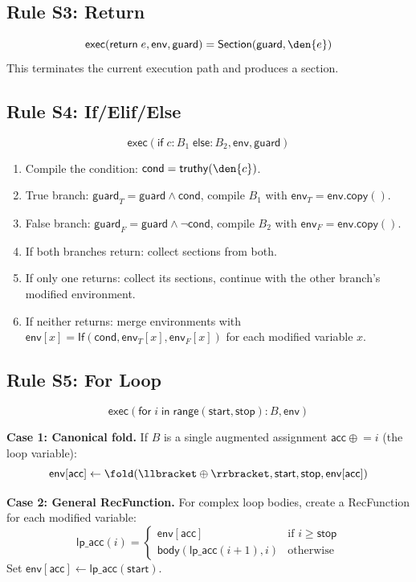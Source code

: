 \subsection{Rule S3: Return}
\[
  \mathsf{exec}(\mathsf{return}\; e, \mathsf{env}, \mathsf{guard}) =
    \mathsf{Section}(\mathsf{guard}, \den{e})
\]
This terminates the current execution path and produces a section.

\subsection{Rule S4: If/Elif/Else}
\[
  \mathsf{exec}(\mathsf{if}\; c: B_1\; \mathsf{else}: B_2,
    \mathsf{env}, \mathsf{guard})
\]
\begin{enumerate}
  \item Compile the condition: $\mathsf{cond} = \mathsf{truthy}(\den{c})$.
  \item True branch: $\mathsf{guard}_T = \mathsf{guard} \land
    \mathsf{cond}$, compile $B_1$ with $\mathsf{env}_T = \mathsf{env.copy()}$.
  \item False branch: $\mathsf{guard}_F = \mathsf{guard} \land
    \lnot\mathsf{cond}$, compile $B_2$ with $\mathsf{env}_F = \mathsf{env.copy()}$.
  \item If both branches return: collect sections from both.
  \item If only one returns: collect its sections, continue with the
    other branch's modified environment.
  \item If neither returns: merge environments with
    $\mathsf{env}[x] = \mathsf{If}(\mathsf{cond}, \mathsf{env}_T[x],
    \mathsf{env}_F[x])$ for each modified variable $x$.
\end{enumerate}

\subsection{Rule S5: For Loop}
\[
  \mathsf{exec}(\mathsf{for}\; i\; \mathsf{in}\; \mathsf{range}(
    \mathsf{start}, \mathsf{stop}): B, \mathsf{env})
\]

\textbf{Case 1: Canonical fold.}  If $B$ is a single augmented
assignment $\mathsf{acc} \mathrel{\oplus}= i$ (the loop variable):
\[
  \mathsf{env}[\mathsf{acc}] \leftarrow \fold(\llbracket \oplus
    \rrbracket, \mathsf{start}, \mathsf{stop}, \mathsf{env}[\mathsf{acc}])
\]

\textbf{Case 2: General RecFunction.}  For complex loop bodies,
create a RecFunction for each modified variable:
\[
  \mathsf{lp\_acc}(i) = \begin{cases}
    \mathsf{env}[\mathsf{acc}] & \text{if } i \geq \mathsf{stop} \\
    \mathsf{body}(\mathsf{lp\_acc}(i+1), i) & \text{otherwise}
  \end{cases}
\]
Set $\mathsf{env}[\mathsf{acc}] \leftarrow \mathsf{lp\_acc}(\mathsf{start})$.

